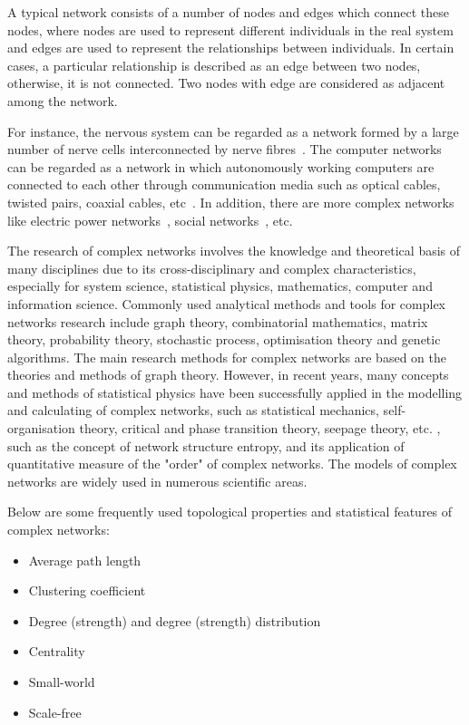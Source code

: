 A typical network consists of a number of nodes and edges which connect these nodes, where nodes are used to represent different individuals in the real system and edges are used to represent the relationships between individuals. In certain cases, a particular relationship is described as an edge between two nodes, otherwise, it is not connected. Two nodes with edge are considered as adjacent among the network.

For instance, the nervous system can be regarded as a network formed by a large number of nerve cells interconnected by nerve fibres~\cite{watts1998collective}. The computer networks can be regarded as a network in which autonomously working computers are connected to each other through communication media such as optical cables, twisted pairs, coaxial cables, etc~\cite{watts1998collective}. In addition, there are more complex networks like electric power networks~\cite{faloutsos1999power}, social networks~\cite{watts1998collective, hofman2017prediction, ebel2002scale}, etc.

The research of complex networks involves the knowledge and theoretical basis of many disciplines due to its cross-disciplinary and complex characteristics, especially for system science, statistical physics, mathematics, computer and information science. Commonly used analytical methods and tools for complex networks research include graph theory, combinatorial mathematics, matrix theory, probability theory, stochastic process, optimisation theory and genetic algorithms. The main research methods for complex networks are based on the theories and methods of graph theory. However, in recent years, many concepts and methods of statistical physics have been successfully applied in the modelling and calculating of complex networks, such as statistical mechanics, self-organisation theory, critical and phase transition theory, seepage theory, etc. \cite{albert2002statistical}, such as the concept of network structure entropy, and its application of quantitative measure of the "order" of complex networks. The models of complex networks are widely used in numerous scientific areas.


\vline

Below are some frequently used topological properties and statistical features of complex networks:

\begin{itemize}
	\item Average path length
	\item Clustering coefficient
	\item Degree (strength) and degree (strength) distribution
	\item Centrality
	\item Small-world
	\item Scale-free
\end{itemize}


